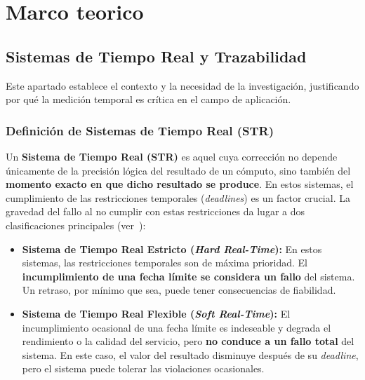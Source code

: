 \chapter{Marco teorico}
\label{ch:marco_teorico}
\graphicspath{{figs/}}



\section{Sistemas de Tiempo Real y Trazabilidad}
\label{sec:sistemas_tiempo_real}

Este apartado establece el contexto y la necesidad de la investigación, justificando por qué la medición temporal es crítica en el campo de aplicación.
\subsection{Definición de Sistemas de Tiempo Real (STR)}
\label{ssec:definicion_str}

Un \textbf{Sistema de Tiempo Real (STR)} es aquel cuya corrección no depende únicamente de la precisión lógica del resultado de un cómputo, sino también del \textbf{momento exacto en que dicho resultado se produce}. En estos sistemas, el cumplimiento de las restricciones temporales (\textit{deadlines}) es un factor crucial. La gravedad del fallo al no cumplir con estas restricciones da lugar a dos clasificaciones principales (ver~\cite{liu2006real}):
\begin{itemize}
\item \textbf{Sistema de Tiempo Real Estricto (\textit{Hard Real-Time}):} En estos sistemas, las restricciones temporales son de máxima prioridad. El \textbf{incumplimiento de una fecha límite se considera un fallo} del sistema. Un retraso, por mínimo que sea, puede tener consecuencias de fiabilidad.    
 \item \textbf{Sistema de Tiempo Real Flexible (\textit{Soft Real-Time}):} El incumplimiento ocasional de una fecha límite es indeseable y degrada el rendimiento o la calidad del servicio, pero \textbf{no conduce a un fallo total} del sistema. En este caso, el valor del resultado disminuye después de su \textit{deadline}, pero el sistema puede tolerar las violaciones ocasionales.
\end{itemize}



